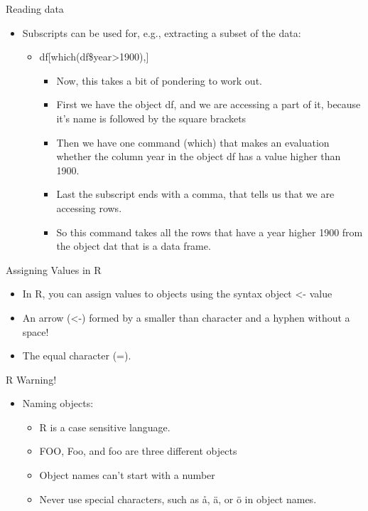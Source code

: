 \documentclass[
  ignorenonframetext,
]{beamer}
\providecommand{\tightlist}{%
  \setlength{\itemsep}{0pt}\setlength{\parskip}{0pt}}
\begin{document}
\begin{frame}{Reading data}
\label{reading-data-5}
\begin{itemize}
\tightlist
\item
  Subscripts can be used for, e.g., extracting a subset of the data:

  \begin{itemize}
  \tightlist
  \item
    df{[}which(df\$year\textgreater1900),{]}

    \begin{itemize}
    \item
      Now, this takes a bit of pondering to work out.
    \item
      First we have the object df, and we are accessing a part of it,
      because it's name is followed by the square brackets
    \item
      Then we have one command (which) that makes an evaluation whether
      the column year in the object df has a value higher than 1900.
    \item
      Last the subscript ends with a comma, that tells us that we are
      accessing rows.
    \item
      So this command takes all the rows that have a year higher 1900
      from the object dat that is a data frame.
    \end{itemize}
  \end{itemize}
\end{itemize}
\end{frame}

\begin{frame}{Assigning Values in R}
\label{assigning-values-in-r}
\begin{itemize}
\tightlist
\item
  In R, you can assign values to objects using the syntax object
  \textless- value
\item
  An arrow (\textless-) formed by a smaller than character and a hyphen
  without a space!
\item
  The equal character (=).
\end{itemize}
\end{frame}

\begin{frame}{R Warning!}
\label{r-warning}
\begin{itemize}
\tightlist
\item
  Naming objects:

  \begin{itemize}
  \tightlist
  \item
    R is a case sensitive language.
  \item
    FOO, Foo, and foo are three different objects
  \item
    Object names can't start with a number
  \item
    Never use special characters, such as å, ä, or ö in object names.
  \end{itemize}
\end{itemize}
\end{frame}
\end{document}
